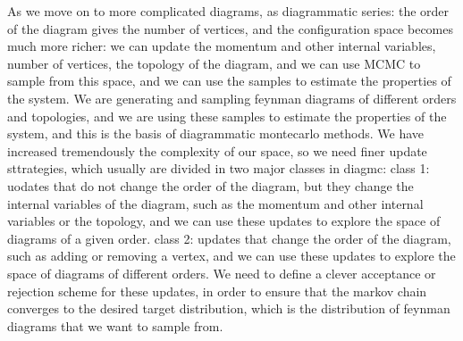 As we move on to more complicated diagrams, as diagrammatic series: the order of the diagram gives the number of vertices, and the configuration space becomes much more richer: we can update the momentum and other internal variables, number of vertices, the topology of the diagram, and we can use MCMC to sample from this space, and we can use the samples to estimate the properties of the system. We are generating and sampling feynman diagrams of different orders and topologies, and we are using these samples to estimate the properties of the system, and this is the basis of diagrammatic montecarlo methods. We have increased tremendously the complexity of our space, so we need finer update sttrategies, which usually are divided in two major classes in diagmc:
class 1: uodates that do not change the order of the diagram, but they change the internal variables of the diagram, such as the momentum and other internal variables or the topology, and we can use these updates to explore the space of diagrams of a given order.
class 2: updates that change the order of the diagram, such as adding or removing a vertex, and we can use these updates to explore the space of diagrams of different orders. We need to define a clever acceptance or rejection scheme for these updates, in order to ensure that the markov chain converges to the desired target distribution, which is the distribution of feynman diagrams that we want to sample from.

